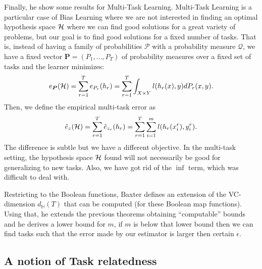 Finally, he show some results for Multi-Task Learning. 
Multi-Task Learning is a particular case of Bias Learning where we are not interested in finding an optimal hypothesis space $\mathcal{H}$ where we can find good solutions for a great variety of problems, but our goal is to find good solutions for a fixed number of tasks. That is, instead of having a family of probabilities $\mathcal{P}$ with a probability measure $\mathcal{Q}$, we have a fixed vector $\bm{P} = (P_1, \ldots, P_T)$ of probability measures over a fixed set of tasks and the learner minimizes:
\begin{equation}
    e_{\bm{P}}(\mathcal{H}) = \sum_{r=1}^T e_{P_r}(h_r)  = \sum_{r=1}^T \int_{X \times Y} l(h_r(x), y) d P_r(x, y) .
\end{equation}
Then, we define the empirical multi-task error as
\begin{equation}\label{eq:mtllearn_exprisk}
    \hat{e}_z(\hypspace) = \sum_{r=1}^\ntasks \hat{e}_{z_r}(h_r) = \sum_{r=1}^\ntasks \sum_{i=1}^m l(h_r(x_i^r), y_i^r).
\end{equation}
The difference is subtle but we have a different objective. In the multi-task setting, the hypothesis space $\mathcal{H}$ found will not necessarily be good for generalizing to new tasks. Also, we have got rid of the $\inf$ term, which was difficult to deal with.
%

Restricting to the Boolean functions, Baxter defines an extension of the VC-dimension $d_\mathbb{H}(T)$ that can be computed (for these Boolean map functions). Using that, he extends the previous theorems obtaining ``computable'' bounds and he derives a lower bound for $m$, if $m$ is below that lower bound then we can find tasks such that the error made by our estimator is larger then certain $\epsilon$.










\subsection{A notion of Task relatedness} %

